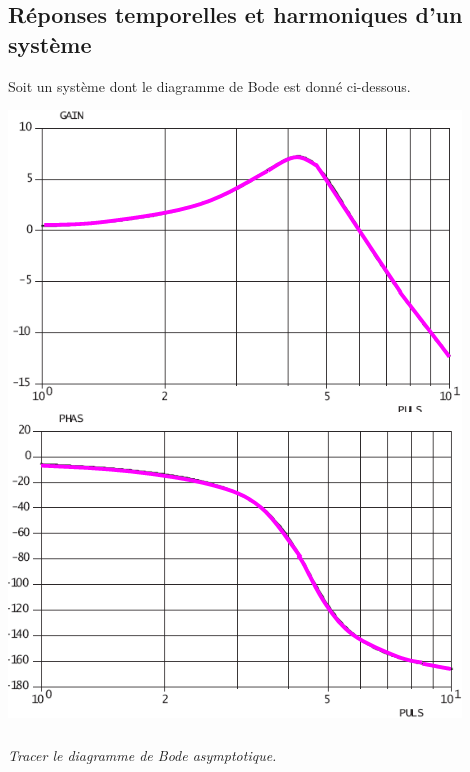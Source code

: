 \documentclass[10pt,fleqn]{article} %
\begin{document}

\vspace{5cm}
\pagestyle{fancy}
\thispagestyle{plain}

\def\columnseprulecolor{\color{ocre}}
\setlength{\columnseprule}{0.4pt} 


\ifprof
\else
\begin{multicols}{2}
\fi
\newpage

\section*{Réponses temporelles et harmoniques d'un système}

\ifprof
\else
Soit un système dont le diagramme de Bode est donné ci-dessous.
\begin{center}
\includegraphics[width=\linewidth]{images/img_01}
\end{center}


\subparagraph{}
\textit{Tracer le diagramme de Bode asymptotique.}
\ifprof
\else
\fi



\end{multicols}
\end{document}
